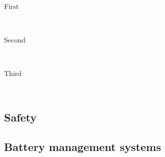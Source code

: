 \documentclass[12pt]{article} %
\begin{document}
\begin{description} %

\item[First] \hfill \\
\lipsum[9] %

\item[Second] \hfill \\
\lipsum[10] %

\item[Third] \hfill \\
\lipsum[11] %

\end{description} 


\subsection{Safety}


\subsection{Battery management systems}








\end{document}
